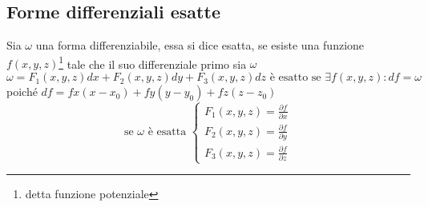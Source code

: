 \subsection{Forme differenziali esatte}
\begin{defi}
	Sia $\omega$ una forma differenziabile, essa si dice {\color{red}esatta},
	se esiste una funzione $f(x,y,z)$\footnote{detta \color{red}funzione
	potenziale} tale che il suo differenziale primo sia $\omega$
	\begin{equation*}
		\omega=F_1(x,y,z)dx+F_2(x,y,z)dy+F_3(x,y,z)dz\text{ è esatto
		se }\exists f(x,y,z):df=\omega
	\end{equation*}
	poiché $df=fx(x-x_0)+fy(y-y_0)+fz(z-z_0)$
	\begin{equation*}
		\text{se $\omega$ è esatta }\begin{cases}
			F_1(x,y,z)=\frac{\partial f}{\partial x}\\
			F_2(x,y,z)=\frac{\partial f}{\partial y}\\
			F_3(x,y,z)=\frac{\partial f}{\partial z}
		\end{cases}
	\end{equation*}
\end{defi}
